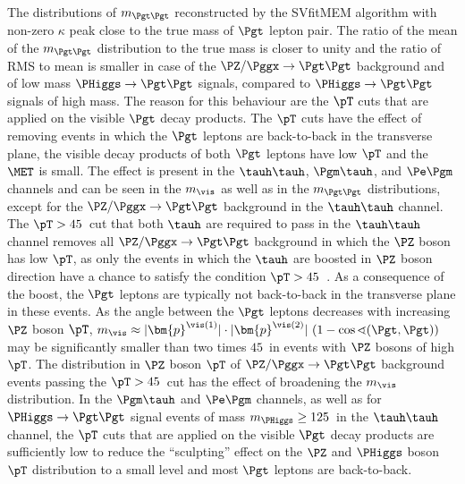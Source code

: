 The distributions of $m_{\Pgt\Pgt}$ reconstructed by the SVfitMEM algorithm with non-zero $\kappa$ 
peak close to the true mass of $\Pgt$ lepton pair.
The ratio of the mean of the $m_{\Pgt\Pgt}$ distribution to the true mass is closer to unity and the ratio of RMS to mean is smaller
in case of the $\PZ/\Pggx \to \Pgt\Pgt$ background and of low mass $\PHiggs \to \Pgt\Pgt$ signals, compared to $\PHiggs \to \Pgt\Pgt$ signals of high mass.
The reason for this behaviour are the $\pT$ cuts that are applied on the visible $\Pgt$ decay products.
The $\pT$ cuts have the effect of removing events in which the $\Pgt$ leptons are back-to-back in the transverse plane,
the visible decay products of both $\Pgt$ leptons have low $\pT$ and the $\MET$ is small.
The effect is present in the $\tauh\tauh$, $\Pgm\tauh$, and $\Pe\Pgm$ channels and can be seen in the $m_{\vis}$ as well as in the $m_{\Pgt\Pgt}$ distributions,
except for the $\PZ/\Pggx \to \Pgt\Pgt$ background in the $\tauh\tauh$ channel.
The $\pT > 45$~\GeV cut that both $\tauh$ are required to pass in the $\tauh\tauh$ channel removes all $\PZ/\Pggx \to \Pgt\Pgt$ background in which the $\PZ$ boson has low $\pT$,
as only the events in which the $\tauh$ are boosted in $\PZ$ boson direction have a chance to satisfy the condition $\pT > 45$~\GeV.
As a consequence of the boost, the $\Pgt$ leptons are typically not back-to-back in the transverse plane in these events.
As the angle between the $\Pgt$ leptons decreases with increasing $\PZ$ boson $\pT$,
$m_{\vis} \approx \vert\bm{p}^{\vis(1)}\vert \cdot \vert\bm{p}^{\vis(2)}\vert \, \left( 1 - \cos\sphericalangle(\Pgt,\Pgt) \right)$
may be significantly smaller than two times $45$~\GeV in events with $\PZ$ bosons of high $\pT$.
The distribution in $\PZ$ boson $\pT$ of $\PZ/\Pggx \to \Pgt\Pgt$ background events passing the $\pT > 45$~\GeV cut
has the effect of broadening the $m_{\vis}$ distribution.
In the $\Pgm\tauh$ and $\Pe\Pgm$ channels, as well as for $\PHiggs \to \Pgt\Pgt$ signal events of mass $m_{\PHiggs} \geq 125$~\GeV in the $\tauh\tauh$ channel,
the $\pT$ cuts that are applied on the visible $\Pgt$ decay products 
are sufficiently low to reduce the ``sculpting'' effect on the $\PZ$ and $\PHiggs$ boson $\pT$ distribution to a small level 
and most $\Pgt$ leptons are back-to-back.

